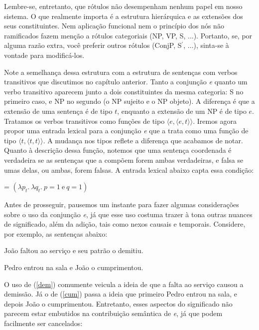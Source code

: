 Lembre-se, entretanto, que rótulos não desempenham nenhum papel em
nosso sistema. O que realmente importa é a estrutura hierárquica e as extensões dos seus constituintes. Nem aplicação funcional nem o princípio dos nós não ramificados fazem  menção a rótulos categoriais (NP, VP, S, ...). Portanto, se, por alguma razão extra, você preferir outros rótulos (ConjP, S$^{\prime}$, ...), sinta-se à vontade para modificá-los.

Note a semelhan\-ça dessa estrutura com a estrutura de senten\-ças
com verbos transitivos que discutimos no capítulo anterior. Tanto
a conjun\-ção \textit{e} quanto um verbo transitivo aparecem junto a dois
constituintes da mesma categoria: S no primeiro caso, e NP no
segundo (o NP sujeito e o NP objeto). A diferen\-ça é que a extensão de uma senten\-ça é de
tipo $t$, enquanto a extensão de um NP é de tipo $e$. Tratamos os
verbos transitivos como fun\-çõ\-es de tipo
$\langle e,\langle e,t \rangle\rangle$. Iremos agora propor uma
entrada lexical para a conjun\-ção  \textit{e} que a trata como uma
fun\-ção de tipo $\langle t,\langle t,t \rangle\rangle$. A
mudan\-ça nos tipos reflete a diferen\-ça que acabamos de notar.
Quanto à descri\-ção dessa fun\-ção, notemos que uma senten\-ça
coordenada é verdadeira se as senten\-ças que a compõem forem
ambas verdadeiras, e falsa se umas delas, ou ambas, forem falsas.
A entrada lexical abaixo capta essa condi\-ção:

\begin{exe}
	\ex {} = $(\lambda p_{t}.\ \lambda q_{t}.\ p=1\ \text{e}\ q=1)$
\end{exe}

Antes de prosseguir, pausemos um instante para fazer algumas considerações sobre o uso da conjunção \textit{e}, já que esse uso  costuma trazer à tona outras nuances de significado, além da adição, tais como nexos causais e temporais. Considere, por exemplo, as sentenças abaixo:

\begin{exe}
	\ex João faltou ao serviço e seu patrão o demitiu. \label{dem}
	
	\ex Pedro entrou na sala e João o cumprimentou. \label{cum}	
\end{exe}

\n O uso de (\ref{dem}) comumente veicula a ideia de que a falta ao serviço causou a demissão. Já o de (\ref{cum}) passa a ideia que primeiro Pedro entrou na sala, e depois João o cumprimentou. Entretanto, esses aspectos do significado não parecem estar embutidos na contribuição semântica de \textit{e}, já que podem facilmente ser cancelados:

